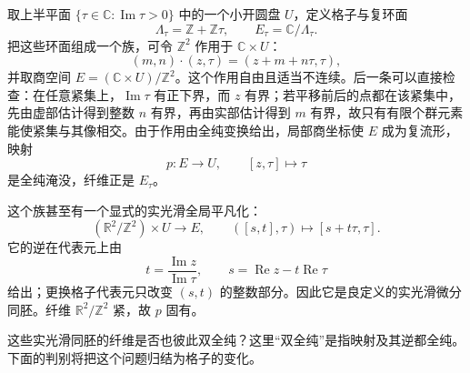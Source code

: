 取上半平面 \(\{\tau\in\mathbb C:\operatorname{Im}\tau>0\}\) 中的一个小开圆盘 \(U\)，定义格子与复环面
\[
	\Lambda_\tau=\mathbb Z+\mathbb Z\tau,
	\qquad E_\tau=\mathbb C/\Lambda_\tau.
\]
把这些环面组成一个族，可令 \(\mathbb Z^2\) 作用于 \(\mathbb C\times U\)：
\[
	(m,n)\cdot(z,\tau)=(z+m+n\tau,\tau),
\]
并取商空间 \(E=(\mathbb C\times U)/\mathbb Z^2\)。这个作用自由且适当不连续。后一条可以直接检查：在任意紧集上，\(\operatorname{Im}\tau\) 有正下界，而 \(z\) 有界；若平移前后的点都在该紧集中，先由虚部估计得到整数 \(n\) 有界，再由实部估计得到 \(m\) 有界，故只有有限个群元素能使紧集与其像相交。由于作用由全纯变换给出，局部商坐标使 \(E\) 成为复流形，映射
\[
	p:E\longrightarrow U,\qquad [z,\tau]\longmapsto\tau
\]
是全纯淹没，纤维正是 \(E_\tau\)。

这个族甚至有一个显式的实光滑全局平凡化：
\begin{equation}\label{g2:eq:complex-torus-smooth-family}
	(\mathbb R^2/\mathbb Z^2)\times U\longrightarrow E,
	\qquad ([s,t],\tau)\longmapsto[s+t\tau,\tau].
\end{equation}
它的逆在代表元上由
\[
	t=\frac{\operatorname{Im}z}{\operatorname{Im}\tau},
	\qquad s=\operatorname{Re}z-t\operatorname{Re}\tau
\]
给出；更换格子代表元只改变 \((s,t)\) 的整数部分。因此它是良定义的实光滑微分同胚。纤维 \(\mathbb R^2/\mathbb Z^2\) 紧，故 \(p\) 固有。

\ProseParagraphBreak

这些实光滑同胚的纤维是否也彼此双全纯？这里“双全纯”是指映射及其逆都全纯。下面的判别将把这个问题归结为格子的变化。

